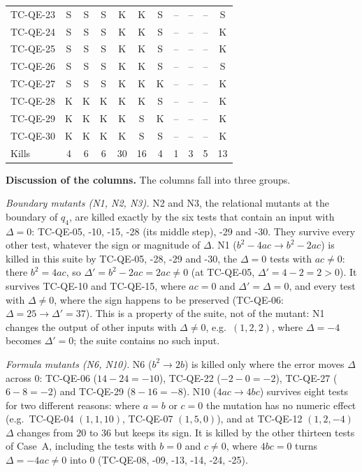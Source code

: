 \documentclass[11pt,a4paper]{article}
\begin{document}
\begin{table}[H]
\begin{tabular}{lcccccccccc}
TC-QE-23 & S & S & S & K & K & S & -- & -- & -- & S \\
TC-QE-24 & S & S & S & K & K & S & -- & -- & -- & K \\
TC-QE-25 & S & S & S & K & K & S & -- & -- & -- & K \\
TC-QE-26 & S & S & S & K & K & S & -- & -- & -- & S \\
TC-QE-27 & S & S & S & K & K & K & -- & -- & -- & K \\
TC-QE-28 & K & K & K & K & K & S & -- & -- & -- & K \\
TC-QE-29 & K & K & K & K & S & K & -- & -- & -- & K \\
TC-QE-30 & K & K & K & K & S & S & -- & -- & -- & K \\
\midrule
Kills & 4 & 6 & 6 & 30 & 16 & 4 & 1 & 3 & 5 & 13 \\
\bottomrule
\end{tabular}
\end{table}

\textbf{Discussion of the columns.} The columns fall into three groups.

\emph{Boundary mutants (N1, N2, N3).} N2 and N3, the relational mutants at
the boundary of \(q_4\), are killed exactly by the six tests that contain an
input with \(\Delta=0\): TC-QE-05, -10, -15, -28 (its middle step), -29 and
-30. They survive every other test, whatever the sign or magnitude of
\(\Delta\). N1 (\(b^2-4ac\to b^2-2ac\)) is killed in this suite by TC-QE-05,
-28, -29 and -30, the \(\Delta=0\) tests with \(ac\ne0\): there \(b^2=4ac\),
so \(\Delta'=b^2-2ac=2ac\ne0\) (at TC-QE-05, \(\Delta'=4-2=2>0\)). It survives
TC-QE-10 and TC-QE-15, where \(ac=0\) and \(\Delta'=\Delta=0\), and every test
with \(\Delta\ne0\), where the sign happens to be preserved (TC-QE-06:
\(\Delta=25\to\Delta'=37\)). This is a property of the suite, not of the
mutant: N1 changes the output of other inputs with \(\Delta\ne0\), e.g.\
\((1,2,2)\), where \(\Delta=-4\) becomes \(\Delta'=0\); the suite contains
no such input.

\emph{Formula mutants (N6, N10).} N6 (\(b^2\to2b\)) is killed only where the
error moves \(\Delta\) across \(0\): TC-QE-06 (\(14-24=-10\)), TC-QE-22
(\(-2-0=-2\)), TC-QE-27 (\(6-8=-2\)) and TC-QE-29 (\(8-16=-8\)). N10
(\(4ac\to4bc\)) survives eight tests for two different reasons: where \(a=b\)
or \(c=0\) the mutation has no numeric effect (e.g.\ TC-QE-04 \((1,1,10)\),
TC-QE-07 \((1,5,0)\)), and at TC-QE-12 \((1,2,-4)\) \(\Delta\) changes from
\(20\) to \(36\) but keeps its sign. It is killed by the other thirteen tests
of Case~A, including the tests with \(b=0\) and \(c\ne0\), where \(4bc=0\)
turns \(\Delta=-4ac\ne0\) into \(0\) (TC-QE-08, -09, -13, -14, -24, -25).
\end{document}
